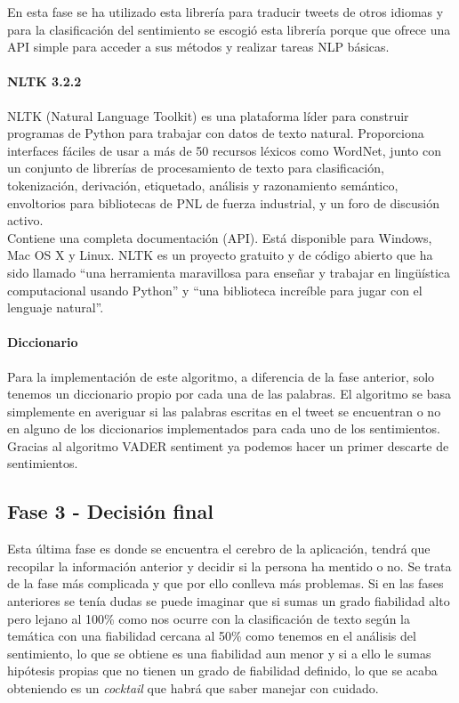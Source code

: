\documentclass[../all.tex]{subfiles}
\begin{document}
        	En esta fase se ha utilizado esta librería para traducir tweets de otros idiomas y para la clasificación del sentimiento se escogió esta librería porque que ofrece una API simple para acceder a sus métodos y realizar tareas NLP básicas.
        	
        \paragraph{NLTK 3.2.2}
			NLTK (Natural Language Toolkit) es una plataforma líder para construir programas de Python para trabajar con datos de texto natural. Proporciona interfaces fáciles de usar a más de 50 recursos léxicos como WordNet, junto con un conjunto de librerías de procesamiento de texto para clasificación, tokenización, derivación, etiquetado, análisis y razonamiento semántico, envoltorios para bibliotecas de PNL de fuerza industrial, y un foro de discusión activo\cite{NLTK}.\\
			
			Contiene una completa documentación (API). Está disponible para Windows, Mac OS X y Linux. NLTK es un proyecto gratuito y de código abierto que ha sido llamado ``una herramienta maravillosa para enseñar y trabajar en lingüística computacional usando Python'' y ``una biblioteca increíble para jugar con el lenguaje natural''.

        \paragraph{Diccionario}
        
            Para la implementación de este algoritmo, a diferencia de la fase anterior, solo tenemos un diccionario propio por cada una de las palabras. El algoritmo se basa simplemente en averiguar si las palabras escritas en el tweet se encuentran o no en alguno de los diccionarios implementados para cada uno de los sentimientos. Gracias al algoritmo VADER sentiment ya podemos hacer un primer descarte de sentimientos.
\newpage
\subsection{Fase 3 - Decisión final}

		Esta última fase es donde se encuentra el cerebro de la aplicación, tendrá que recopilar la información anterior y decidir si la persona ha mentido o no. Se trata de la fase más complicada y que por ello conlleva más problemas. Si en las fases anteriores se tenía dudas se puede imaginar que si sumas un grado fiabilidad alto pero lejano al 100\% como nos ocurre con la clasificación de texto según la temática con una fiabilidad cercana al 50\% como tenemos en el análisis del sentimiento, lo que se obtiene es una fiabilidad aun menor y si a ello le sumas hipótesis propias que no tienen un grado de fiabilidad definido, lo que se acaba obteniendo es un \textit{cocktail} que habrá que saber manejar con cuidado.\\
		
\end{document}
